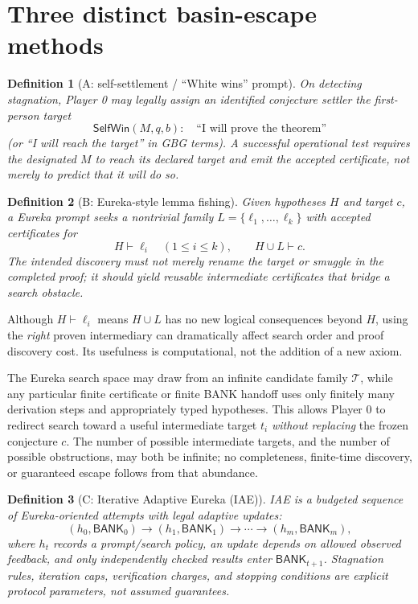 \documentclass[11pt,letterpaper]{article}
\newtheorem{definition}{Definition}[section]
\newcommand{\BANK}{\mathsf{BANK}}
\begin{document}
\section{Three distinct basin-escape methods}
\begin{definition}[A: self-settlement / ``White wins'' prompt]
On detecting stagnation, Player 0 may legally assign an identified conjecture settler the first-person target
\[
\mathsf{SelfWin}(M,q,b): \quad \text{``I will prove the theorem''} 
\]
(or ``I will reach the target'' in GBG terms). A successful operational test requires the designated $M$ to reach its declared target and emit the accepted certificate, not merely to predict that it will do so.
\end{definition}

\begin{definition}[B: Eureka-style lemma fishing]
Given hypotheses $H$ and target $c$, a Eureka prompt seeks a nontrivial family $L=\{\ell_1,\dots,\ell_k\}$ with accepted certificates for
\[
H\vdash\ell_i\quad(1\le i\le k),\qquad H\cup L\vdash c.
\]
The intended discovery must not merely rename the target or smuggle in the completed proof; it should yield reusable intermediate certificates that bridge a search obstacle.
\end{definition}
Although $H\vdash\ell_i$ means $H\cup L$ has no new logical consequences beyond $H$, using the \emph{right} proven intermediary can dramatically affect search order and proof discovery cost. Its usefulness is computational, not the addition of a new axiom.

The Eureka search space may draw from an infinite candidate family $\mathcal T$, while any particular finite certificate or finite BANK handoff uses only finitely many derivation steps and appropriately typed hypotheses. This allows Player 0 to redirect search toward a useful intermediate target $t_i$ \emph{without replacing} the frozen conjecture $c$. The number of possible intermediate targets, and the number of possible obstructions, may both be infinite; no completeness, finite-time discovery, or guaranteed escape follows from that abundance.

\begin{definition}[C: Iterative Adaptive Eureka (IAE)]
IAE is a budgeted sequence of Eureka-oriented attempts with legal adaptive updates:
\[
(h_0,\BANK_0)\to(h_1,\BANK_1)\to\cdots\to(h_m,\BANK_m),
\]
where $h_t$ records a prompt/search policy, an update depends on allowed observed feedback, and only independently checked results enter $\BANK_{t+1}$. Stagnation rules, iteration caps, verification charges, and stopping conditions are explicit protocol parameters, not assumed guarantees.
\end{definition}
\end{document}
